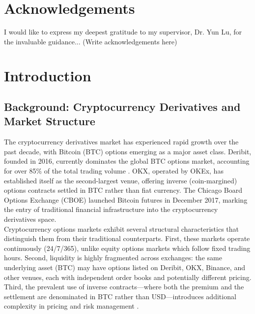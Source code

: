 \documentclass[openany]{book}
\numberwithin{figure}{chapter}
\numberwithin{equation}{chapter}
\begin{document}
\chapter*{Acknowledgements}

I would like to express my deepest gratitude to my supervisor, Dr. Yun Lu, for the invaluable guidance... (Write acknowledgements here)

\tableofcontents
\listoffigures
\listoftables
\newpage
{}

\chapter{Introduction}

\section{Background: Cryptocurrency Derivatives and Market Structure}

The cryptocurrency derivatives market has experienced rapid growth over the past decade, with Bitcoin (BTC) options emerging as a major asset class. Deribit, founded in 2016, currently dominates the global BTC options market, accounting for over 85\% of the total trading volume \cite{cao2021}. OKX, operated by OKEx, has established itself as the second-largest venue, offering inverse (coin-margined) options contracts settled in BTC rather than fiat currency. The Chicago Board Options Exchange (CBOE) launched Bitcoin futures in December 2017, marking the entry of traditional financial infrastructure into the cryptocurrency derivatives space.\\

Cryptocurrency options markets exhibit several structural characteristics that distinguish them from their traditional counterparts. First, these markets operate continuously (24/7/365), unlike equity options markets which follow fixed trading hours. Second, liquidity is highly fragmented across exchanges: the same underlying asset (BTC) may have options listed on Deribit, OKX, Binance, and other venues, each with independent order books and potentially different pricing. Third, the prevalent use of inverse contracts---where both the premium and the settlement are denominated in BTC rather than USD---introduces additional complexity in pricing and risk management \cite{cao2021}.\\
\end{document}
